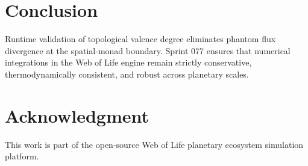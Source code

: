 \documentclass[10pt,journal,compsoc]{IEEEtran}
\begin{document}
\section{Conclusion}
Runtime validation of topological valence degree eliminates phantom flux divergence at the spatial-monad boundary. Sprint 077 ensures that numerical integrations in the Web of Life engine remain strictly conservative, thermodynamically consistent, and robust across planetary scales.

\section*{Acknowledgment}
This work is part of the open-source Web of Life planetary ecosystem simulation platform.
\end{document}
